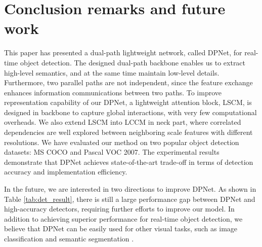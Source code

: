 \documentclass[lettersize,journal]{IEEEtran}
\begin{document}
\section{Conclusion remarks and future work}\label{sec:Conclusion}

This paper has presented a dual-path lightweight network, called DPNet, for real-time object detection. The designed dual-path backbone enables us to extract high-level semantics, and at the same time maintain low-level details. Furthermore, two parallel paths are not independent, since the feature exchange enhances information communications between two paths. To improve representation capability of our DPNet, a lightweight attention block, LSCM, is designed in backbone to capture global interactions, with very few computational overheads. We also extend LSCM into LCCM in neck part, where correlated dependencies are well explored between neighboring scale features with different resolutions. We have evaluated our method on two popular object detection datasets: MS COCO and Pascal VOC 2007. The experimental results demonstrate that DPNet achieves state-of-the-art trade-off in terms of detection accuracy and implementation efficiency.

In the future, we are interested in two directions to improve DPNet. As shown in Table \ref{tab:det_result}, there is still a large performance gap between DPNet and high-accuracy detectors, requiring further efforts to improve our model. In addition to achieving superior performance for real-time object detection, we believe that DPNet can be easily used for other visual tasks, such as image classification \cite{resnet} and semantic segmentation \cite{huang2019ccnet,zhu2019asymmetric}.

  
\end{document}
